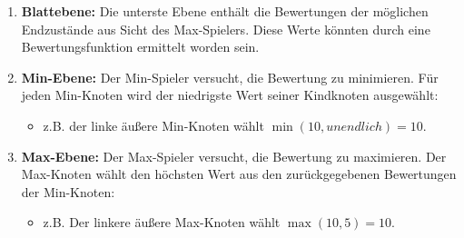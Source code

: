 \begin{enumerate}
	\item \textbf{Blattebene:} Die unterste Ebene enthält die Bewertungen der möglichen Endzustände aus Sicht des Max-Spielers. Diese Werte könnten durch eine Bewertungsfunktion ermittelt worden sein.

	\item \textbf{Min-Ebene:} Der Min-Spieler versucht, die Bewertung zu minimieren. Für jeden Min-Knoten wird der niedrigste Wert seiner Kindknoten ausgewählt:
	\begin{itemize}
		\item z.B. der linke äußere Min-Knoten wählt $\min(10, unendlich) = 10$.
	\end{itemize}
	
	\item \textbf{Max-Ebene:} Der Max-Spieler versucht, die Bewertung zu maximieren. Der Max-Knoten wählt den höchsten Wert aus den zurückgegebenen Bewertungen der Min-Knoten:
	\begin{itemize}
		\item z.B. Der linkere äußere Max-Knoten wählt $\max(10, 5) = 10$.
	\end{itemize}
\end{enumerate}

